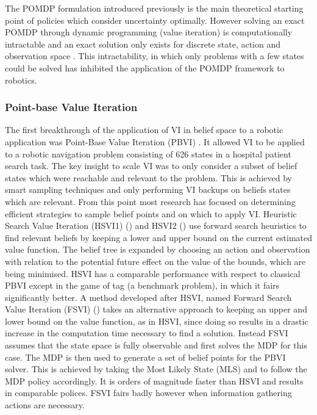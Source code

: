The POMDP formulation introduced previously is the main theoretical starting point of policies which
consider uncertainty optimally. However solving an exact POMDP through dynamic programming (value iteration) is 
computationally intractable and an exact solution only exists for discrete state, action and observation space \cite[Chap. 15]{Thrun_2005}. 
This intractability, in which only problems with a few states could be solved has inhibited the application of the POMDP framework to robotics. 

\subsubsection{Point-base Value Iteration}

The first breakthrough of the application of VI in belief space to a robotic application was Point-Base Value Iteration (PBVI) \cite{PBVI}. It allowed VI to be applied to a robotic 
navigation problem consisting of 626 states in a hospital patient search task. The key insight to scale VI was to only consider a subset of belief 
states which were reachable and relevant to the problem. This is achieved by smart sampling techniques and only performing VI backups on beliefs states which are relevant. 
From this point most research has focused on determining efficient strategies to sample belief points and on which to apply VI. Heuristic Search Value Iteration (HSVI1) (\cite{HSV}) 
and HSVI2 (\cite{HSVI2}) use forward search heuristics to find relevant beliefs by keeping a lower and upper bound on the current estimated value function. The belief tree 
is expanded by choosing an action and observation with relation to the potential future effect on the value of the bounds, which are being minimised. HSVI has a comparable performance with respect to classical PBVI except in the
game of tag (a benchmark problem), in which it fairs significantly better. 
A method developed after HSVI, named Forward Search Value Iteration (FSVI) (\cite{FSVI}) takes an alternative approach to keeping an upper and lower bound on the 
value function, as in HSVI, since doing so results in a drastic increase in the computation time necessary to find a solution. Instead FSVI assumes that the state 
space is fully observable and first solves the MDP for this case. The MDP is then used to generate a set of belief points for the PBVI solver. This is achieved by 
taking the Most Likely State (MLS) and to follow the MDP policy accordingly. It is orders of magnitude faster than HSVI and results in comparable polices. FSVI fairs badly however when information gathering actions are necessary. 
